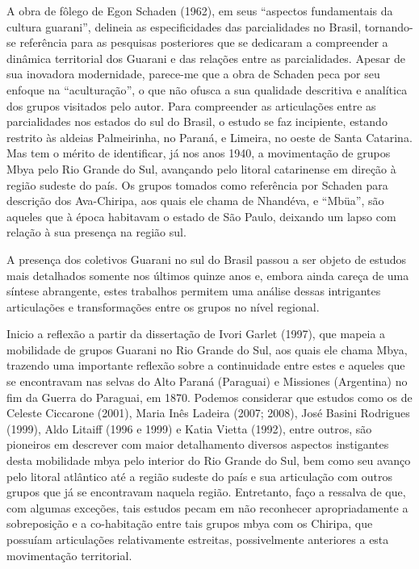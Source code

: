 \documentclass{article}
\begin{document}
A obra de f\^olego de Egon Schaden (1962), em seus
{\textquotedblleft}aspectos fundamentais da cultura
guarani{\textquotedblright}, delineia as especificidades das
parcialidades no Brasil, tornando-se refer\^encia para as pesquisas
posteriores que se dedicaram a compreender a din\^amica territorial dos
Guarani e das rela\c{c}\~oes entre as parcialidades. Apesar de sua
inovadora modernidade, parece-me que a obra de Schaden peca por seu
enfoque na {\textquotedblleft}acultura\c{c}\~ao{\textquotedblright}, o
que n\~ao ofusca a sua qualidade descritiva e anal\'itica dos grupos
visitados pelo autor. Para compreender as articula\c{c}\~oes entre as
parcialidades nos estados do sul do Brasil, o estudo se faz incipiente,
estando restrito \`as aldeias Palmeirinha, no Paran\'a, e Limeira, no
oeste de Santa Catarina. Mas tem o m\'erito de identificar, j\'a nos
anos 1940, a movimenta\c{c}\~ao de grupos Mbya pelo Rio Grande do Sul,
avan\c{c}ando pelo litoral catarinense em dire\c{c}\~ao \`a regi\~ao
sudeste do pa\'is. Os grupos tomados como refer\^encia por Schaden para
descri\c{c}\~ao dos Ava-Chiripa, aos quais ele chama de Nhand\'eva, e
{\textquotedblleft}Mb\"ua{\textquotedblright}, s\~ao aqueles que \`a
\'epoca habitavam o estado de S\~ao Paulo, deixando um lapso com
rela\c{c}\~ao \`a sua presen\c{c}a na regi\~ao sul.

A presen\c{c}a dos coletivos Guarani no sul do Brasil passou a ser
objeto de estudos mais detalhados somente nos \'ultimos quinze anos e,
embora ainda care\c{c}a de uma s\'intese abrangente, estes trabalhos
permitem uma an\'alise dessas intrigantes articula\c{c}\~oes e
transforma\c{c}\~oes entre os grupos no n\'ivel regional. 

Inicio a reflex\~ao a partir da disserta\c{c}\~ao de Ivori Garlet
(1997), que mapeia a mobilidade de grupos Guarani no Rio Grande do Sul,
aos quais ele chama Mbya, trazendo uma importante reflex\~ao sobre a
continuidade entre estes e aqueles que se encontravam nas selvas do
Alto Paran\'a (Paraguai) e Missiones (Argentina) no fim da Guerra do
Paraguai, em 1870. Podemos considerar que estudos como os de Celeste
Ciccarone (2001), Maria In\^es Ladeira (2007; 2008), Jos\'e Basini
Rodrigues (1999), Aldo Litaiff (1996 e 1999) e Katia Vietta (1992),
entre outros, s\~ao pioneiros em descrever com maior detalhamento
diversos aspectos instigantes desta mobilidade mbya pelo interior do
Rio Grande do Sul, bem como seu avan\c{c}o pelo litoral atl\^antico
at\'e a regi\~ao sudeste do pa\'is e sua articula\c{c}\~ao com outros
grupos que j\'a se encontravam naquela regi\~ao. Entretanto, fa\c{c}o a
ressalva de que, com algumas exce\c{c}\~oes, tais estudos pecam em
n\~ao reconhecer apropriadamente a sobreposi\c{c}\~ao e a
co-habita\c{c}\~ao entre tais grupos mbya com os Chiripa, que
possu\'iam articula\c{c}\~oes relativamente estreitas, possivelmente
anteriores a esta movimenta\c{c}\~ao territorial.
\end{document}
